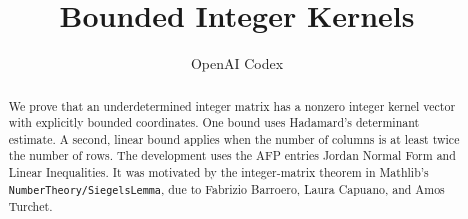 \documentclass[11pt,a4paper]{article}
\begin{document}
\title{Bounded Integer Kernels}
\author{OpenAI Codex}
\maketitle

\begin{abstract}
We prove that an underdetermined integer matrix has a nonzero integer
kernel vector with explicitly bounded coordinates. One bound uses
Hadamard's determinant estimate. A second, linear bound applies when
the number of columns is at least twice the number of rows.
The development uses the AFP entries Jordan Normal Form and Linear
Inequalities. It was motivated by the integer-matrix theorem in
Mathlib's \texttt{NumberTheory/SiegelsLemma}, due to Fabrizio Barroero,
Laura Capuano, and Amos Turchet.
\end{abstract}


\end{document}
